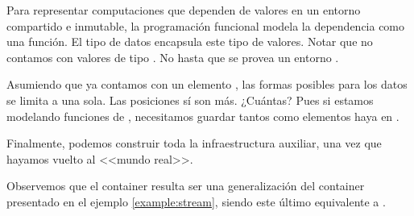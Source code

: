 
\begin{example}
  Para representar computaciones que dependen de valores en un entorno compartido e inmutable, la programación funcional modela la dependencia como una función. El tipo de datos   encapsula este tipo de valores. Notar que no contamos con valores de tipo . No hasta que se provea un entorno .


  Asumiendo que ya contamos con un elemento , las formas posibles para los datos se limita a una sola. Las posiciones sí son más. ¿Cuántas? Pues si estamos modelando funciones de \AgdaSymbol{$\to$}, necesitamos guardar tantos  como elementos haya en .
  

Finalmente, podemos construir toda la infraestructura auxiliar, una vez que hayamos vuelto al <<mundo real>>. 


Observemos que el container  resulta ser una generalización del container  presentado en el ejemplo \ref{example:stream}, siendo este último equivalente a  \AgdaDatatype{$\Nat$}.

\end{example}
\vspace{2ex}



  



